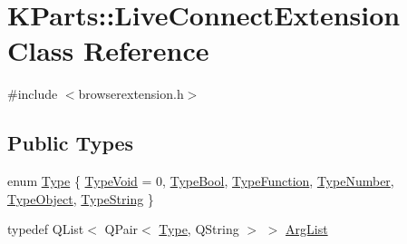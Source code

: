 \hypertarget{classKParts_1_1LiveConnectExtension}{\section{\-K\-Parts\-:\-:\-Live\-Connect\-Extension \-Class \-Reference}
\label{classKParts_1_1LiveConnectExtension}
}


{\ttfamily \#include $<$browserextension.\-h$>$}

\subsection*{\-Public \-Types}
\begin{DoxyCompactItemize}
\item 
enum \hyperlink{classKParts_1_1LiveConnectExtension_a8dfff0d5feb20316c714179c9eda9a9c}{\-Type} \{ \*
\hyperlink{classKParts_1_1LiveConnectExtension_a8dfff0d5feb20316c714179c9eda9a9ca862f2f5258607f30adbbe03395426c20}{\-Type\-Void} = 0, 
\hyperlink{classKParts_1_1LiveConnectExtension_a8dfff0d5feb20316c714179c9eda9a9ca3fed8b3ab2f5490fd7e6c6fca8b4a14b}{\-Type\-Bool}, 
\hyperlink{classKParts_1_1LiveConnectExtension_a8dfff0d5feb20316c714179c9eda9a9ca9f107d1ffb0bab7084c2952c00cf7f79}{\-Type\-Function}, 
\hyperlink{classKParts_1_1LiveConnectExtension_a8dfff0d5feb20316c714179c9eda9a9cadd765f23d443e96389613f184e874987}{\-Type\-Number}, 
\*
\hyperlink{classKParts_1_1LiveConnectExtension_a8dfff0d5feb20316c714179c9eda9a9cadc439c83b2bb144692429d76408cb5b7}{\-Type\-Object}, 
\hyperlink{classKParts_1_1LiveConnectExtension_a8dfff0d5feb20316c714179c9eda9a9ca2f39f6b5f442bd7909c8810770d3ca95}{\-Type\-String}
 \}
\item 
typedef \-Q\-List$<$ \-Q\-Pair$<$ \hyperlink{classKParts_1_1LiveConnectExtension_a8dfff0d5feb20316c714179c9eda9a9c}{\-Type}, \*
\-Q\-String $>$ $>$ \hyperlink{classKParts_1_1LiveConnectExtension_a16a7a582605755e47eaab5b37e73d8cb}{\-Arg\-List}
\end{DoxyCompactItemize}
